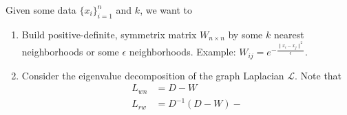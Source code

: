 \documentclass[12pt]{article}
\theoremstyle{plain}
\begin{document}
Given some data $ \{ x_i \}_{i = 1}^n $ and $ k $, we want to
\begin{enumerate}
  \item Build positive-definite, symmetrix matrix $ W_{n \times n} $ by some $ k $ nearest neighborhoods or some $ \epsilon $ neighborhoods.
  Example: $ W_{ij} = e^{- \frac{\| x_i - x_j \|^2}{\epsilon}} $.
  \item Consider the eigenvalue decomposition of the graph Laplacian $ \mathcal{L} $.
  Note that
  \begin{align*}
    L_{wn} &= D - W \\
    L_{rw} &= D^{-1} (D - W) -
  \end{align*}
\end{enumerate}
\end{document}
